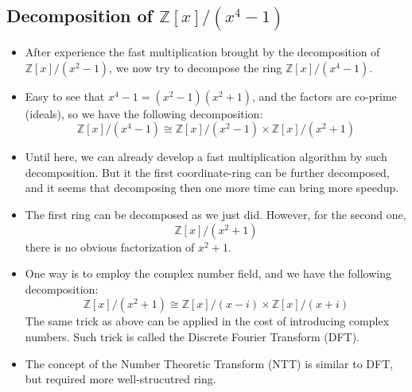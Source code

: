 \subsection{Decomposition of \( \mathbb{Z}[x]/(x^4-1) \)}

\begin{frame}
    \begin{itemize}
        \item <1->After experience the fast multiplication brought by the decomposition of 
            \( \mathbb{Z}[x]/(x^{2}-1) \), we now try to decompose the ring 
            \( \mathbb{Z}[x]/(x^{4}-1) \).
        \item <2->Easy to see that \(x^{4}-1 = (x^{2}-1)(x^2+1)\), 
            and the factors are co-prime (ideals),
            so we have the following decomposition:
            \[ \mathbb{Z}[x]/(x^4 - 1) \cong 
            \mathbb{Z}[x]/(x^2 - 1) \times 
            \mathbb{Z}[x]/(x^2 + 1) \]
        \item <3->Until here, we can already develop a fast multiplication algorithm by such decomposition.
            But it the first coordinate-ring can be further decomposed,
            and it seems that decomposing then one more time can bring more speedup.
        \item <4->The first ring can be decomposed as we just did.
            However, for the second one,
            \[ \mathbb{Z}[x]/(x^2 + 1) \]
            there is no obvious factorization of \(x^2 + 1\).
        \item <5->One way is to employ the complex number field, 
            and we have the following decomposition:
            \[ \mathbb{Z}[x]/(x^2 + 1) \cong 
            \mathbb{Z}[x]/(x - i) \times 
            \mathbb{Z}[x]/(x + i) \]
            The same trick as above can be applied in the cost of introducing complex numbers.
            Such trick is called the Discrete Fourier Transform (DFT).
        \item <6->The concept of the Number Theoretic Transform (NTT) is similar to DFT, 
            but required more well-strucutred ring.
    \end{itemize}
\end{frame}

